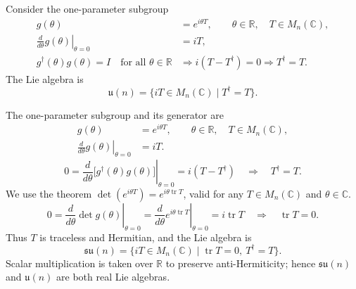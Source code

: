 \documentclass[11pt,a4paper]{article}
\newcommand{\topic}[1]{\par\addvspace{\medskipamount}\noindent{\bfseries\boldmath #1}\par\nopagebreak}
\begin{document}
\topic{$U(n)$}

Consider the one-parameter subgroup
\begin{equation*}
\begin{aligned}
g(\theta)&=e^{i\theta T},\qquad \theta\in\mathbb R,\quad T\in M_n(\mathbb C),\\[6pt]
\left.\frac{d}{d\theta}g(\theta)\right|_{\theta=0}&=iT,\\[6pt]
g^\dagger(\theta)g(\theta)=I\quad\text{for all }\theta\in\mathbb R
&\Longrightarrow i(T-T^\dagger)=0
\Longrightarrow T^\dagger=T.
\end{aligned}
\tag{4.6}\label{eq:4.6}
\end{equation*}
The Lie algebra is
\begin{equation*}
\mathfrak{u}(n)=\{iT\in M_n(\mathbb C)\mid T^\dagger=T\}.
\end{equation*}

\topic{$SU(n)$}

The one-parameter subgroup and its generator are
\begin{equation*}
\begin{aligned}
g(\theta)&=e^{i\theta T},\qquad \theta\in\mathbb R,\quad T\in M_n(\mathbb C),\\[6pt]
\left.\frac{d}{d\theta}g(\theta)\right|_{\theta=0}&=iT.
\end{aligned}
\tag{4.7}\label{eq:4.7}
\end{equation*}
\begin{equation*}
0=\left.\frac{d}{d\theta}\bigl[g^\dagger(\theta)g(\theta)\bigr]\right|_{\theta=0}
=i(T-T^\dagger)
\quad\Longrightarrow\quad T^\dagger=T.
\end{equation*}
We use the theorem $\det(e^{i\theta T})=e^{i\theta\operatorname{tr}T}$, valid for any $T\in M_n(\mathbb C)$ and $\theta\in\mathbb C$.
\begin{equation*}
0=\left.\frac{d}{d\theta}\det g(\theta)\right|_{\theta=0}
=\left.\frac{d}{d\theta}e^{i\theta\operatorname{tr}T}\right|_{\theta=0}
=i\operatorname{tr}T
\quad\Longrightarrow\quad \operatorname{tr}T=0.
\end{equation*}
Thus $T$ is traceless and Hermitian, and the Lie algebra is
\begin{equation*}
\mathfrak{su}(n)=\{iT\in M_n(\mathbb C)\mid
\operatorname{tr}T=0,\ T^\dagger=T\}.
\tag{4.8}\label{eq:4.8}
\end{equation*}
Scalar multiplication is taken over $\mathbb R$ to preserve anti-Hermiticity; hence $\mathfrak{su}(n)$ and  $\mathfrak{u}(n)$ are both real Lie algebras.
\end{document}
